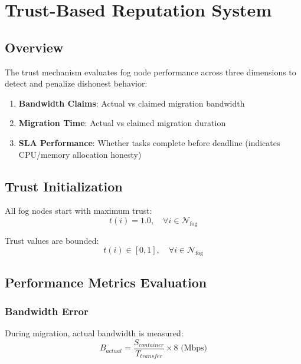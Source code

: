 \documentclass[12pt,a4paper]{article}
\begin{document}
\section{Trust-Based Reputation System}

\subsection{Overview}

The trust mechanism evaluates fog node performance across three dimensions to detect and penalize dishonest behavior:

\begin{enumerate}
    \item \textbf{Bandwidth Claims}: Actual vs claimed migration bandwidth
    \item \textbf{Migration Time}: Actual vs claimed migration duration
    \item \textbf{SLA Performance}: Whether tasks complete before deadline (indicates CPU/memory allocation honesty)
\end{enumerate}

\subsection{Trust Initialization}

All fog nodes start with maximum trust:
\begin{equation}
    t(i) = 1.0, \quad \forall i \in \mathcal{N}_{\text{fog}}
\end{equation}

Trust values are bounded:
\begin{equation}
    t(i) \in [0, 1], \quad \forall i \in \mathcal{N}_{\text{fog}}
\end{equation}

\subsection{Performance Metrics Evaluation}

\subsubsection{Bandwidth Error}

During migration, actual bandwidth is measured:
\begin{equation}
    B_{actual} = \frac{S_{container}}{T_{transfer}} \times 8 \text{ (Mbps)}
\end{equation}
\end{document}
